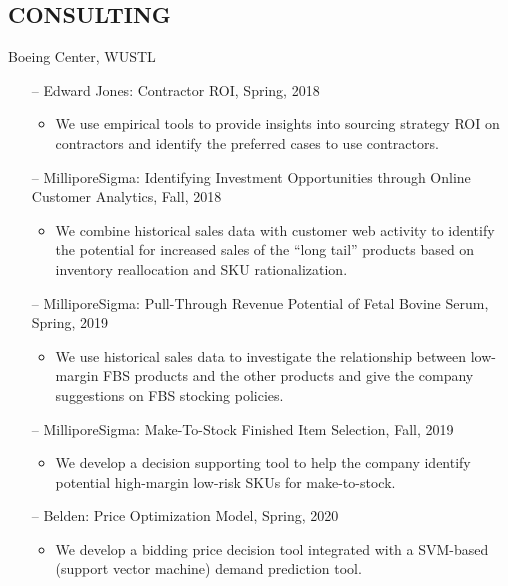 \documentclass[margin]{res} %
\begin{document}
\begin{resume}
\section{CONSULTING}
    Boeing Center, WUSTL
    \begin{itemize}
        \item[--]Edward Jones: Contractor ROI, Spring, 2018
            \begin{itemize}
                \item We use empirical tools to provide insights into sourcing strategy ROI on contractors and identify the preferred cases to use contractors.
            \end{itemize}	
        \item[--]MilliporeSigma: Identifying Investment Opportunities through Online Customer Analytics, Fall, 2018
            \begin{itemize}
                \item We combine historical sales data with customer web activity to identify the potential for increased sales of the “long tail” products based on inventory reallocation and SKU rationalization.   
            \end{itemize}
        \item[--]MilliporeSigma: Pull-Through Revenue Potential of Fetal Bovine Serum, Spring, 2019
            \begin{itemize}
                \item We use historical sales data to investigate the relationship between low-margin FBS products and the other products and give the company suggestions on FBS stocking policies.   
            \end{itemize}
        \item[--]MilliporeSigma: Make-To-Stock Finished Item Selection, Fall, 2019
            \begin{itemize}
                \item We develop a decision supporting tool to help the company identify potential high-margin low-risk SKUs for make-to-stock.
            \end{itemize}
        \item[--]Belden: Price Optimization Model, Spring, 2020
            \begin{itemize}
                \item We develop a bidding price decision tool integrated with a SVM-based (support vector machine) demand prediction tool.
            \end{itemize}

\end{itemize}
\end{resume}
\end{document}
